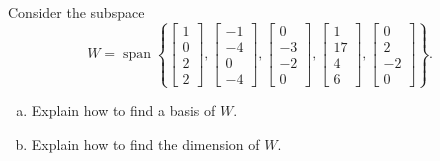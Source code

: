 
\begin{exerciseStatement}


Consider the subspace \[W=\operatorname{span}  \left\{ \left[\begin{array}{c}
1 \\
0 \\
2 \\
2
\end{array}\right] , \left[\begin{array}{c}
-1 \\
-4 \\
0 \\
-4
\end{array}\right] , \left[\begin{array}{c}
0 \\
-3 \\
-2 \\
0
\end{array}\right] , \left[\begin{array}{c}
1 \\
17 \\
4 \\
6
\end{array}\right] , \left[\begin{array}{c}
0 \\
2 \\
-2 \\
0
\end{array}\right] \right\} .\]


\begin{enumerate}[(a)]
\item  Explain how to find a basis of \(W\).
\item  Explain how to find the dimension of \(W\).
\end{enumerate}
    
\end{exerciseStatement}
    
